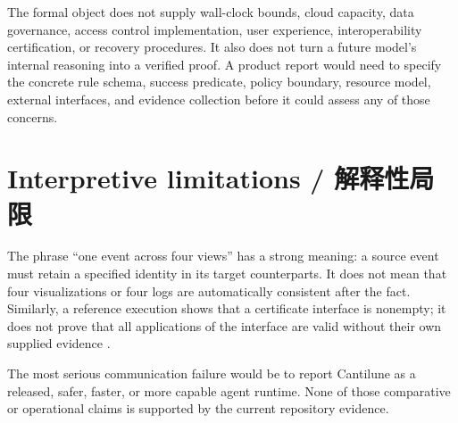The formal object does not supply wall-clock bounds, cloud capacity, data governance, access
control implementation, user experience, interoperability certification, or recovery procedures.
It also does not turn a future model's internal reasoning into a verified proof. A product report
would need to specify the concrete rule schema, success predicate, policy boundary, resource
model, external interfaces, and evidence collection before it could assess any of those concerns.

\section{Interpretive limitations / 解释性局限}

The phrase “one event across four views” has a strong meaning: a source event must retain a
specified identity in its target counterparts. It does not mean that four visualizations or four
logs are automatically consistent after the fact. Similarly, a reference execution shows that a
certificate interface is nonempty; it does not prove that all applications of the interface are
valid without their own supplied evidence \citep{cantiluneRFCOne,cantiluneRFCTwo}.

\begin{MWRisk}
The most serious communication failure would be to report Cantilune as a released, safer, faster,
or more capable agent runtime. None of those comparative or operational claims is supported by
the current repository evidence.
\end{MWRisk}
